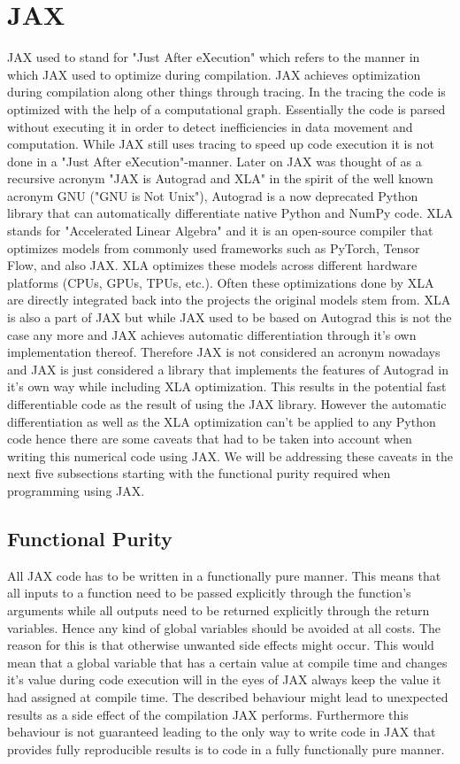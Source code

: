 \documentclass[a4paper, oneside]{discothesis}
\begin{document}
\section{JAX} \label{sec:jax}
JAX used to stand for "Just After eXecution" which refers to the manner in which JAX used to optimize during compilation.
JAX achieves optimization during compilation along other things through tracing.
In the tracing the code is optimized with the help of a computational graph.
Essentially the code is parsed without executing it in order to detect inefficiencies in data movement and computation.
While JAX still uses tracing to speed up code execution it is not done in a "Just After eXecution"-manner.
Later on JAX was thought of as a recursive acronym "JAX is Autograd and XLA" in the spirit of the well known acronym GNU ("GNU is Not Unix"),
Autograd is a now deprecated Python library that can automatically differentiate native Python and NumPy code.
XLA stands for "Accelerated Linear Algebra" and it is an open-source compiler that optimizes models from commonly used frameworks such as PyTorch, Tensor Flow, and also JAX.
XLA optimizes these models across different hardware platforms (CPUs, GPUs, TPUs, etc.).
Often these optimizations done by XLA are directly integrated back into the projects the original models stem from.
XLA is also a part of JAX but while JAX used to be based on Autograd this is not the case any more and JAX achieves automatic differentiation through it's own implementation thereof.
Therefore JAX is not considered an acronym nowadays and JAX is just considered a library that implements the features of Autograd in it's own way while including XLA optimization.
This results in the potential fast differentiable code as the result of using the JAX library.
However the automatic differentiation as well as the XLA optimization can't be applied to any Python code hence there are some caveats that had to be taken into account when writing this numerical code using JAX.
We will be addressing these caveats in the next five subsections starting with the functional purity required when programming using JAX.

\subsection{Functional Purity}
All JAX code has to be written in a functionally pure manner.
This means that all inputs to a function need to be passed explicitly through the function's arguments while all outputs need to be returned explicitly through the return variables.
Hence any kind of global variables should be avoided at all costs.
The reason for this is that otherwise unwanted side effects might occur.
This would mean that a global variable that has a certain value at compile time and changes it's value during code execution will in the eyes of JAX always keep the value it had assigned at compile time.
The described behaviour might lead to unexpected results as a side effect of the compilation JAX performs.
Furthermore this behaviour is not guaranteed leading to the only way to write code in JAX that provides fully reproducible results is to code in a fully functionally pure manner.
\end{document}
